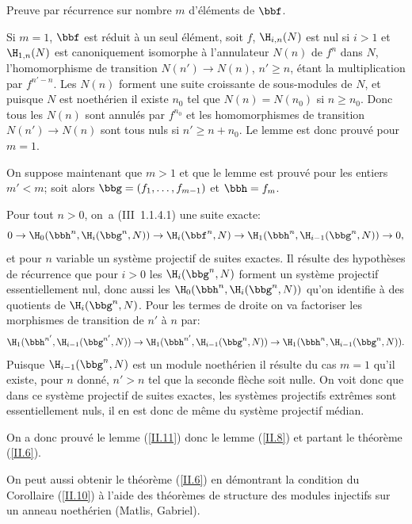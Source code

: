 Preuve par r\'ecurrence sur \ignorespaces nombre $m$ d'\'el\'ements de $\bbf$.

Si $m=1$, $\bbf$ est r\'eduit \`a un seul \'el\'ement, soit $f$, $\H_{i, n}(N)$ est nul si $i>1$ et $\H_{1, n}(N)$ est canoniquement isomorphe \`a l'annulateur $N(n)$ de $f^n$ dans $N$, l'homomorphisme de transition $N(n')\to N(n)$, $n'\geq n$, \'etant la multiplication par $f^{n'-n}$. Les $N(n)$ forment une suite croissante de sous-modules de $N$, et puisque $N$ est noeth\'erien il existe $n_0$ tel que $N(n)=N(n_0)$ si $n\geq n_0$. Donc tous les $N(n)$ sont annul\'es par $f^{n_0}$ et les homomorphismes de transition $N(n')\to N(n)$ sont tous nuls si $n'\geq n+n_0$. Le lemme est donc prouv\'e pour $m=1$.

On suppose maintenant que $m>1$ et que le lemme est prouv\'e pour les entiers $m'<m$; soit alors $\bbg=(f_1, \ldots, f_{m-1})$ et $\bbh=f_m$.

Pour tout $n>0$, on~a (\EGA III~1.1.4.1) une suite exacte:
\begin{equation*}
0 \to \H_0(\bbh^n, \H_i(\bbg^n, N)) \to \H_i(\bbf^n, N) \to \H_1(\bbh^n, \H_{i-1}(\bbg^n, N)) \to 0,
\end{equation*}
et pour $n$ variable un syst\`eme projectif de suites exactes. Il r\'esulte des hypoth\`eses de r\'ecurrence que pour $i>0$ les $\H_i(\bbg^n, N)$ forment un syst\`eme projectif essentiellement nul, donc aussi les $\H_0(\bbh^n, \H_i(\bbg^n, N))$ qu'on identifie \`a des quotients de $\H_i(\bbg^n, N)$. Pour les termes de droite on va factoriser les morphismes de transition de $n'$ \`a $n$ par:
\begin{equation*}
\H_1(\bbh^{n'}, \H_{i-1}(\bbg^{n'}, N)) \to \H_1(\bbh^{n'}, \H_{i-1}(\bbg^{n}, N)) \to \H_1(\bbh^{n}, \H_{i-1}(\bbg^{n}, N)).
\end{equation*}
Puisque $\H_{i-1}(\bbg^{n}, N)$ est un module noeth\'erien il r\'esulte du cas $m=1$ qu'il existe, pour $n$ donn\'e, $n'>n$ tel que la seconde fl\`eche soit nulle. On voit donc que dans ce syst\`eme projectif de suites exactes, les syst\`emes projectifs extr\^emes sont essentiellement nuls, il en est donc de m\^eme du syst\`eme projectif m\'edian.

On a donc prouv\'e le lemme (\ref{II.11}) donc le lemme (\ref{II.8}) et partant le th\'eor\`eme (\ref{II.6}).

\begin{remarquestar}
On peut aussi obtenir le th\'eor\`eme (\ref{II.6}) en d\'emontrant la condition du Corollaire (\ref{II.10}) \`a l'aide des th\'eor\`emes de structure des modules injectifs sur un anneau noeth\'erien (Matlis, Gabriel).
\end{remarquestar}

